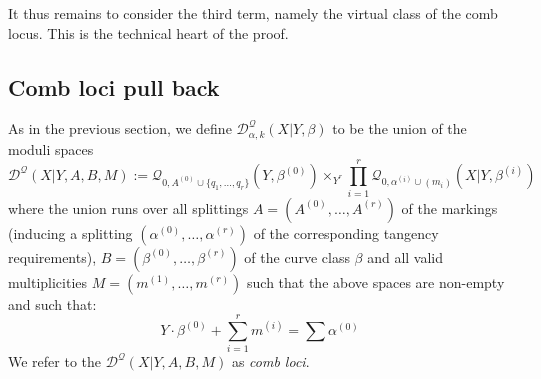 \documentclass[11pt]{amsart}
\newcommand{\Q}[4]{\mathcal{Q}_{#1,#2}(#3,#4)}
\newcommand{\PP}{\mathbb P}
\newcommand{\Aaff}{\mathbb{A}}
\newcommand{\Gm}{\mathbb{G}_{\text{m}}}
\newcommand{\virt}[1]{[#1]^{\operatorname{virt}}}
\newcommand{\bcd}{\begin{center}\begin{tikzcd}}
\newcommand{\ecd}{\end{tikzcd}\end{center}}
\newcommand{\om}[1]{\mathcal{#1}}
\theoremstyle{definition}
\theoremstyle{definition}
\newtheorem{remark}[thm]{Remark}
\newcommand{\ilemph}[1]{\emph{#1}}
\begin{document}
\noindent It thus remains to consider the third term, namely the virtual class of the comb locus. This is the technical heart of the proof.

\subsection{Comb loci pull back} \label{Subsection comb loci pull back} As in the previous section, we define $\mathcal D^\mathcal{Q}_{\alpha,k}(X|Y,\beta)$ to be the union of the moduli spaces
\begin{equation*} \mathcal D^{\mathcal{Q}}(X|Y,A,B,M) := \Q{0}{A^{(0)} \cup \{q_1, \ldots, q_r\}}{Y}{\beta^{(0)}} \times_{Y^r} \prod_{i=1}^r \Q{0}{\alpha^{(i)}\cup (m_i)}{X|Y}{\beta^{(i)}} \end{equation*}
where the union runs over all splittings $A = (A^{(0)},\ldots,A^{(r)})$ of the markings (inducing a splitting $(\alpha^{(0)}, \ldots, \alpha^{(r)})$ of the corresponding tangency requirements), $B = (\beta^{(0)}, \ldots, \beta^{(r)})$ of the curve class $\beta$ and all valid multiplicities $M = (m^{(1)}, \ldots, m^{(r)})$ such that the above spaces are non-empty and such that:
\[
Y \cdot \beta^{(0)} +\sum_{i=1}^r m^{(i)}=\sum \alpha^{(0)}
\]
We refer to the $\mathcal D^{\mathcal{Q}}(X|Y,A,B,M)$ as \emph{comb loci}.
\begin{comment}
\begin{remark} \label{GIT comparison remark} Note that $Y$ is not in general toric, and so we should clarify what we mean by:
\begin{equation*} \om{Q}(Y) = \Q{0}{A^{(0)} \cup \{ q_1, \ldots, q_n \}}{Y}{\beta^{(0)}} \end{equation*}
There are two possibilities here: one is to \emph{define} this space as the cartesian product
\bcd
\om{Q}(Y) \ar[r] \ar[d] \ar[rd,phantom,"\square"] & \om{Q}(H) \ar[d] \\
\om{Q}(X) \ar[r,"k"] & \om{Q}(\PP^N)
\ecd
and equip it with the virtual class pulled back along $k$:
\begin{equation*} \virt{\om{Q}(Y)} := k^! [ \om{Q}(H) ] \end{equation*}
Using this definition, $\om{Q}(Y)$ consists of those quasimaps in $\om{Q}(X)$ for which $u_Y \equiv 0$.
This has obvious advantages from the point of view of our computations, but is conceptually unsatisfying. 

On the other hand, $X$ is a GIT quotient  $\Aaff^{\Sigma_X(1)}  \sslash \Gm^r$, and $Y \subseteq X$ defines a $\Gm^r$-invariant subvariety $C(Y)$ of $\Aaff^{\Sigma_X(1)}$, which we call the \ilemph{cone over Y}.
Then $Y$ is equal to the GIT quotient
\begin{equation*} Y = C(Y) \sslash \Gm^r \end{equation*}
and so we may use the more general theory of quasimaps to GIT quotients \cite{CFKM} to define $\om{Q}(Y)$ and its virtual class.  

In fact these two definitions of $\om{Q}(Y)$ agree:  there exists an isomorphism between these moduli spaces which preserves the virtual classes. We show this in Appendix~\ref{Section comparison with GIT construction}.
\end{remark}
\end{comment}
\end{document}

